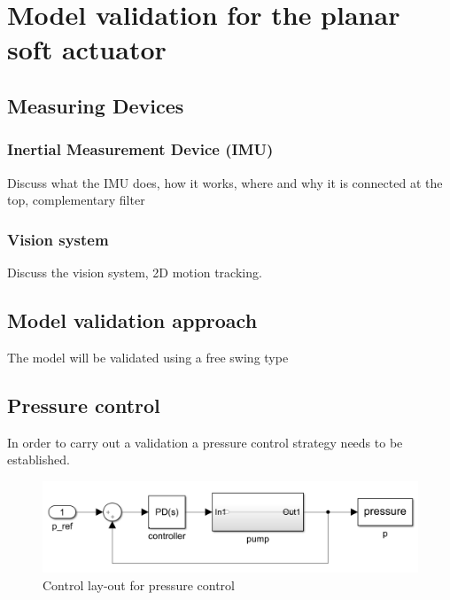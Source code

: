 \section{Model validation for the planar soft actuator}


\subsection{Measuring Devices}


\subsubsection{Inertial Measurement Device (IMU)}


Discuss what the IMU does, how it works, where and why it is connected at the top, complementary filter



\subsubsection{Vision system}

Discuss the vision system, 2D motion tracking.



\subsection{Model validation approach}

The model will be validated using a free swing type





\subsection{Pressure control}

In order to carry out a validation a pressure control strategy needs to be established.  


\begin{figure}[H]
    \centering
    \includegraphics[width = \linewidth]{Figures/Chapter2/pressurecontrol.png}
    \caption{Control lay-out for pressure control}
    \label{fig2:pcontrol}
\end{figure}







